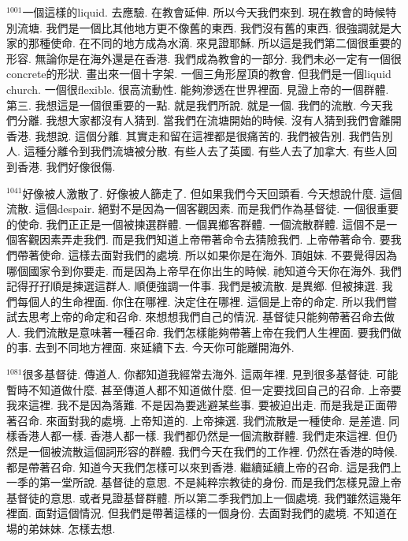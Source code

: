 \documentclass{book}
\begin{document}
$^{1001}$一個這樣的liquid.
去應驗.
在教會延伸.
所以今天我們來到.
現在教會的時候特別流塘.
我們是一個比其他地方更不像舊的東西.
我們沒有舊的東西.
很強調就是大家的那種使命.
在不同的地方成為水滴.
來見證耶穌.
所以這是我們第二個很重要的形容.
無論你是在海外還是在香港.
我們成為教會的一部分.
我們未必一定有一個很concrete的形狀.
畫出來一個十字架.
一個三角形屋頂的教會.
但我們是一個liquid church.
一個很flexible.
很高流動性.
能夠滲透在世界裡面.
見證上帝的一個群體.
第三.
我想這是一個很重要的一點.
就是我們所說.
就是一個.
我們的流散.
今天我們分離.
我想大家都沒有人猜到.
當我們在流塘開始的時候.
沒有人猜到我們會離開香港.
我想說.
這個分離.
其實走和留在這裡都是很痛苦的.
我們被告別.
我們告別人.
這種分離令到我們流塘被分散.
有些人去了英國.
有些人去了加拿大.
有些人回到香港.
我們好像很傷.

$^{1041}$好像被人激散了.
好像被人篩走了.
但如果我們今天回頭看.
今天想說什麼.
這個流散.
這個despair.
絕對不是因為一個客觀因素.
而是我們作為基督徒.
一個很重要的使命.
我們正正是一個被揀選群體.
一個異鄉客群體.
一個流散群體.
這個不是一個客觀因素弄走我們.
而是我們知道上帝帶著命令去猜險我們.
上帝帶著命令.
要我們帶著使命.
這樣去面對我們的處境.
所以如果你是在海外.
頂姐妹.
不要覺得因為哪個國家令到你要走.
而是因為上帝早在你出生的時候.
祂知道今天你在海外.
我們記得孖孖順是揀選這群人.
順便強調一件事.
我們是被流散.
是異鄉.
但被揀選.
我們每個人的生命裡面.
你住在哪裡.
決定住在哪裡.
這個是上帝的命定.
所以我們嘗試去思考上帝的命定和召命.
來想想我們自己的情況.
基督徒只能夠帶著召命去做人.
我們流散是意味著一種召命.
我們怎樣能夠帶著上帝在我們人生裡面.
要我們做的事.
去到不同地方裡面.
來延續下去.
今天你可能離開海外.

$^{1081}$很多基督徒.
傳道人.
你都知道我經常去海外.
這兩年裡.
見到很多基督徒.
可能暫時不知道做什麼.
甚至傳道人都不知道做什麼.
但一定要找回自己的召命.
上帝要我來這裡.
我不是因為落難.
不是因為要逃避某些事.
要被迫出走.
而是我是正面帶著召命.
來面對我的處境.
上帝知道的.
上帝揀選.
我們流散是一種使命.
是差遣.
同樣香港人都一樣.
香港人都一樣.
我們都仍然是一個流散群體.
我們走來這裡.
但仍然是一個被流散這個詞形容的群體.
我們今天在我們的工作裡.
仍然在香港的時候.
都是帶著召命.
知道今天我們怎樣可以來到香港.
繼續延續上帝的召命.
這是我們上一季的第一堂所說.
基督徒的意思.
不是純粹宗教徒的身份.
而是我們怎樣見證上帝基督徒的意思.
或者見證基督群體.
所以第二季我們加上一個處境.
我們雖然這幾年裡面.
面對這個情況.
但我們是帶著這樣的一個身份.
去面對我們的處境.
不知道在場的弟妹妹.
怎樣去想.
\end{document}
